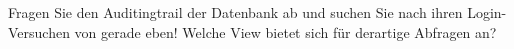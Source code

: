     \item Fragen Sie den Auditingtrail der Datenbank ab und suchen Sie nach ihren Login-Versuchen von gerade eben! Welche View bietet sich für derartige Abfragen an?
